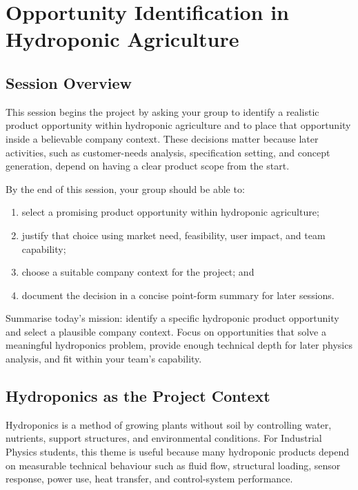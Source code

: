 \chapter{Opportunity Identification in Hydroponic Agriculture}

\section{Session Overview}

This session begins the project by asking your group to identify a realistic product opportunity within hydroponic agriculture and to place that opportunity inside a believable company context. These decisions matter because later activities, such as customer-needs analysis, specification setting, and concept generation, depend on having a clear product scope from the start.

By the end of this session, your group should be able to:
\begin{enumerate}
    \item select a promising product opportunity within hydroponic agriculture;
    \item justify that choice using market need, feasibility, user impact, and team capability;
    \item choose a suitable company context for the project; and
    \item document the decision in a concise point-form summary for later sessions.
\end{enumerate}

\begin{tcolorbox}[title=Goal]
Summarise today's mission: identify a specific hydroponic product opportunity and select a plausible company context. Focus on opportunities that solve a meaningful hydroponics problem, provide enough technical depth for later physics analysis, and fit within your team's capability.
\end{tcolorbox}

\section{Hydroponics as the Project Context}

Hydroponics is a method of growing plants without soil by controlling water, nutrients, support structures, and environmental conditions. For Industrial Physics students, this theme is useful because many hydroponic products depend on measurable technical behaviour such as fluid flow, structural loading, sensor response, power use, heat transfer, and control-system performance.

